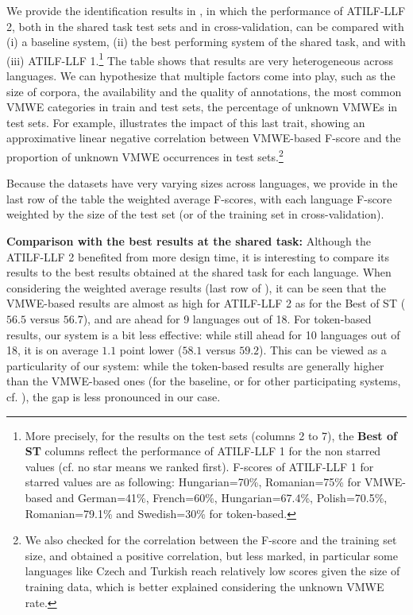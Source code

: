 \documentclass[output=paper,modfonts]{langscibook}
\begin{document}
We provide the identification results in , in which the performance of ATILF-LLF 2, both in the shared task test sets and in cross-validation, can be compared with (i) a baseline system, (ii) the best performing system of the shared task, and with (iii) ATILF-LLF 1.\footnote{More precisely, for the results on the test sets (columns 2 to 7), the \textbf{Best of ST} columns reflect the performance of ATILF-LLF 1 for the non starred values (cf. no star means we ranked first). F-scores of ATILF-LLF 1 for starred values are as following: Hungarian=70\%, Romanian=75\% for VMWE-based and German=41\%, French=60\%, Hungarian=67.4\%, Polish=70.5\%, Romanian=79.1\% and Swedish=30\% for token-based.} The table shows that results are very heterogeneous across languages. We can hypothesize that multiple factors come into play, such as the size of corpora, the availability and the quality of annotations, the most common VMWE categories in train and test sets, the percentage of unknown VMWEs in test sets. For example,  illustrates the impact of this last trait, showing an approximative linear negative correlation between VMWE-based F-score and the proportion of unknown VMWE occurrences in test sets.\footnote{We also checked for the correlation between the F-score and the training set size, and obtained a positive correlation, but less marked, in particular some languages like Czech and Turkish reach relatively low scores given the size of training data, which is better explained considering the unknown VMWE rate.}

Because the datasets have very varying sizes across languages, we provide in the last row of the table the weighted average F-scores, with each language F-score weighted by the size of the test set (or of the training set in cross-validation).

\textbf{Comparison with the best results at the shared task:}
Although the ATILF-LLF 2 benefited from more design time, it is interesting to compare its results to the best results obtained at the shared task for each language. When considering the weighted average results (last row of ), it can be seen that the VMWE-based results are almost as high for ATILF-LLF 2 as for the Best of ST ($56.5$ versus $56.7$), and are ahead for 9 languages out of 18. For token-based results, our system is a bit less effective: while still ahead for 10 languages out of 18, it is on average $1.1$ point lower ($58.1$ versus $59.2$). This can be viewed as a particularity of our system: while the token-based results are generally higher than the VMWE-based ones (for the baseline, or for other participating systems, cf. \citealt{MWEWorkshop}), the gap is less pronounced in our case.
\end{document}
